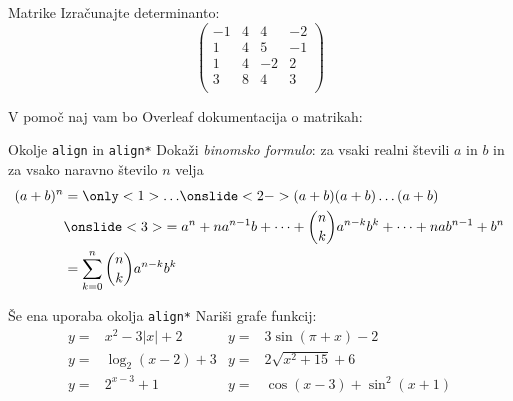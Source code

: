 \begin{frame}{Matrike}
	Izračunajte determinanto:
$$
	\begin{pmatrix}
		-1 & 4 & 4 & -2\\
		1 & 4 & 5 & -1\\
		1 & 4 & -2 & 2\\
		3 & 8 & 4 & 3\\
	\end{pmatrix}
$$	
	
	V pomoč naj vam bo Overleaf dokumentacija o matrikah:
	\href{https://www.overleaf.com/learn/latex/Matrices}{}
\end{frame}

\begin{frame}{Okolje \texttt{align} in \texttt{align*}}
	Dokaži \emph{binomsko formulo}: za vsaki realni števili $a$ in $b$ in za vsako naravno število $n$ velja
	\begin{align*}
		(a+b)^n &= \only<1>{\ldots} 
		\onslide<2->{(a+b) (a+b) \dots (a+b)}\\
		&\onslide<3>{= a^n + n a^{n-1} b + \dots + \binom{n}{k} a^{n-k} b^k + \dots + n a b^{n-1} + b^n}\\
		&= \sum_{k=0}^n \binom{n}{k} a^{n-k} b^k
	\end{align*}
\end{frame}

\begin{frame}{Še ena uporaba okolja \texttt{align*}}
	Nariši grafe funkcij:
	\begin{align*}
		y = &x^2 - 3|x| + 2    &y = &3 \sin(\pi+x) - 2 \\
		y = &\log_2(x-2) + 3   &y = &2 \sqrt{x^2+15} + 6 \\
		y = &2^{x-3} + 1       &y = &\cos(x-3) + \sin^2(x+1)\\
	\end{align*} 
\end{frame}

